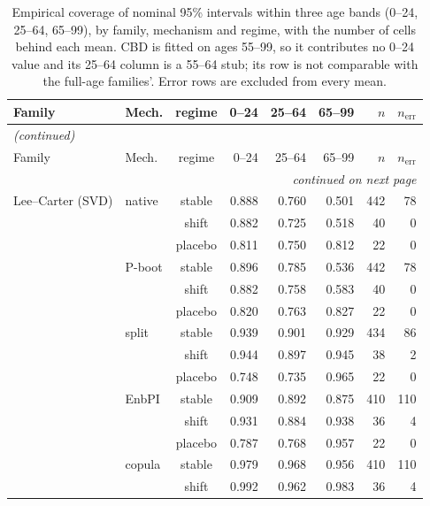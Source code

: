 {\footnotesize\setlength{\tabcolsep}{2.5pt}
\begin{longtable}{@{}llcrrrrr@{}}
\caption{Empirical coverage of nominal 95\% intervals within three age bands (0--24, 25--64, 65--99), by family, mechanism and regime, with the number of cells behind each mean. CBD is fitted on ages 55--99, so it contributes no 0--24 value and its 25--64 column is a 55--64 stub; its row is not comparable with the full-age families'. Error rows are excluded from every mean.}\label{tab:h4-age} \\
\toprule
Family & Mech. & regime & 0--24 & 25--64 & 65--99 & $n$ & $n_{\mathrm{err}}$ \\
\midrule
\endfirsthead
\multicolumn{8}{l}{\emph{(continued)}} \\
\toprule
Family & Mech. & regime & 0--24 & 25--64 & 65--99 & $n$ & $n_{\mathrm{err}}$ \\
\midrule
\endhead
\midrule \multicolumn{8}{r}{\emph{continued on next page}} \\
\endfoot
\bottomrule
\endlastfoot
Lee--Carter (SVD) & native & stable & 0.888 & 0.760 & 0.501 & 442 & 78 \\
 &  & shift & 0.882 & 0.725 & 0.518 & 40 & 0 \\
 &  & placebo & 0.811 & 0.750 & 0.812 & 22 & 0 \\
 & P-boot & stable & 0.896 & 0.785 & 0.536 & 442 & 78 \\
 &  & shift & 0.882 & 0.758 & 0.583 & 40 & 0 \\
 &  & placebo & 0.820 & 0.763 & 0.827 & 22 & 0 \\
 & split & stable & 0.939 & 0.901 & 0.929 & 434 & 86 \\
 &  & shift & 0.944 & 0.897 & 0.945 & 38 & 2 \\
 &  & placebo & 0.748 & 0.735 & 0.965 & 22 & 0 \\
 & EnbPI & stable & 0.909 & 0.892 & 0.875 & 410 & 110 \\
 &  & shift & 0.931 & 0.884 & 0.938 & 36 & 4 \\
 &  & placebo & 0.787 & 0.768 & 0.957 & 22 & 0 \\
 & copula & stable & 0.979 & 0.968 & 0.956 & 410 & 110 \\
 &  & shift & 0.992 & 0.962 & 0.983 & 36 & 4 \\

\end{longtable}}
